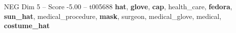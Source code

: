 \begin{textsample}{NEG Dim 5 – Score -5.00 – t005688}  \label{ex:f5_neg_032}
\textbf{hat}, \textbf{glove}, \textbf{cap}, health\_care, \textbf{fedora}, \textbf{sun\_hat}, medical\_procedure, \textbf{mask}, surgeon, medical\_glove, medical, \textbf{costume\_hat}

\end{textsample}
